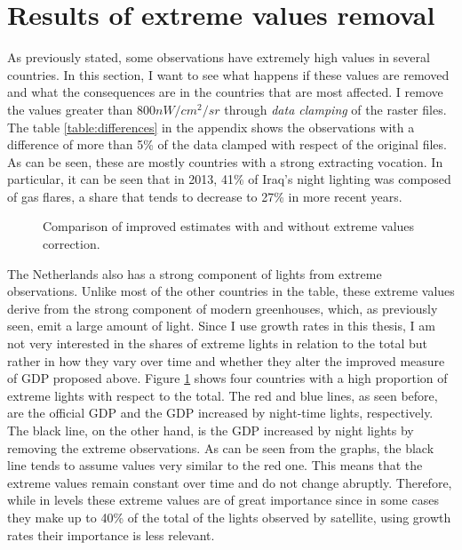 \section{Results of extreme values removal}
As previously stated, some observations have extremely high values in several countries.
In this section, I want to see what happens if these values are removed and what the consequences are in the countries that are most affected.
I remove the values greater than $800nW/cm^2/sr$ through \textit{data clamping} of the raster files.
The table \ref{table:differences} in the appendix shows the observations with a difference of more than 5\% of the data clamped with respect of the original files.
As can be seen, these are mostly countries with a strong extracting vocation.
In particular, it can be seen that in 2013, 41\% of Iraq's night lighting was composed of gas flares, a share that tends to decrease to 27\% in more recent years.
\begin{figure}[h!]
    \centering
    \hspace*{-2.8cm}
    \quad
    \hspace*{-2.8cm}
    \caption{Comparison of improved estimates with and without extreme values correction.}%
    \label{fig:outliersgraph}
\end{figure}
The Netherlands also has a strong component of lights from extreme observations. Unlike most of the other countries in the table, these extreme values derive from the strong component of modern greenhouses, which, as previously seen, emit a large amount of light.
Since I use growth rates in this thesis, I am not very interested in the shares of extreme lights in relation to the total but rather in how they vary over time and whether they alter the improved measure of GDP proposed above.
Figure \ref{fig:outliersgraph} shows four countries with a high proportion of extreme lights with respect to the total. The red and blue lines, as seen before, are the official GDP and the GDP increased by night-time lights, respectively. The black line, on the other hand, is the GDP increased by night lights by removing the extreme observations.
As can be seen from the graphs, the black line tends to assume values very similar to the red one. This means that the extreme values remain constant over time and do not change abruptly.
Therefore, while in levels these extreme values are of great importance since in some cases they make up to 40\% of the total of the lights observed by satellite, using growth rates their importance is less relevant.



